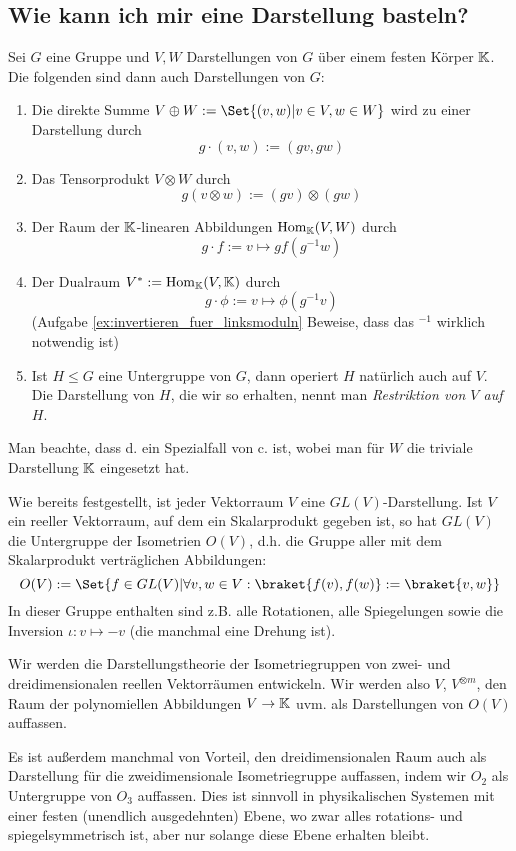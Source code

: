 \subsection{Wie kann ich mir eine Darstellung basteln?}
\begin{lemmadef}
Sei $G$ eine Gruppe und $V,W$ Darstellungen von $G$ über einem festen Körper $\mathbb{K}$. Die folgenden sind dann auch Darstellungen von $G$:
\begin{enumerate}
\item Die direkte Summe $V\oplus W := \Set{(v,w) | v\in V, w\in W}$ wird zu einer Darstellung durch
\[g\cdot(v,w) := (gv,gw)\]
\item Das Tensorprodukt $V\otimes W$ durch
\[g(v\otimes w) := (gv)\otimes (gw)\]
\item Der Raum der $\mathbb{K}$-linearen Abbildungen $\operatorname{Hom}_{\mathbb{K}}(V,W)$ durch
\[g\cdot f := v\mapsto gf(g^{-1} w)\]
\item Der Dualraum $V^\ast:= \operatorname{Hom}_{\mathbb{K}}(V,\mathbb{K})$ durch
\[g\cdot \phi := v\mapsto \phi(g^{-1} v)\]
(Aufgabe \ref{ex:invertieren_fuer_linksmoduln} Beweise, dass das $^{-1}$ wirklich notwendig ist)
\item Ist $H\leq G$ eine Untergruppe von $G$, dann operiert $H$ natürlich auch auf $V$. Die Darstellung von $H$, die wir so erhalten, nennt man \emph{Restriktion von $V$ auf $H$}.
\end{enumerate}
\end{lemmadef}

\begin{remark}
Man beachte, dass d. ein Spezialfall von c. ist, wobei man für $W$ die triviale Darstellung $\mathbb{K}$ eingesetzt hat.
\end{remark}

\begin{example}
Wie bereits festgestellt, ist jeder Vektorraum $V$ eine $GL(V)$-Darstellung. Ist $V$ ein reeller Vektorraum, auf dem ein Skalarprodukt gegeben ist, so hat $GL(V)$ die Untergruppe der Isometrien $O(V)$, d.h. die Gruppe aller mit dem Skalarprodukt verträglichen Abbildungen:
\[O(V) := \Set{f\in GL(V) | \forall v,w\in V: \braket{f(v),f(w)} := \braket{v,w}}\]
In dieser Gruppe enthalten sind z.B. alle Rotationen, alle Spiegelungen sowie die Inversion $\iota: v\mapsto -v$ (die manchmal eine Drehung ist).

\smallbreak
Wir werden die Darstellungstheorie der Isometriegruppen von zwei- und dreidimensionalen reellen Vektorräumen entwickeln. Wir werden also $V$, $V^{\otimes m}$, den Raum der polynomiellen Abbildungen $V\to\mathbb{K}$ uvm. als Darstellungen von $O(V)$ auffassen.

\smallbreak
Es ist außerdem manchmal von Vorteil, den dreidimensionalen Raum auch als Darstellung für die zweidimensionale Isometriegruppe auffassen, indem wir $O_2$ als Untergruppe von $O_3$ auffassen. Dies ist sinnvoll in physikalischen Systemen mit einer festen (unendlich ausgedehnten) Ebene, wo zwar alles rotations- und spiegelsymmetrisch ist, aber nur solange diese Ebene erhalten bleibt.
\end{example}

